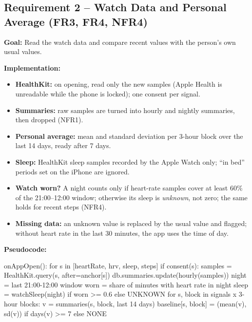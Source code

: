 \documentclass[conference]{IEEEtran}
\newcommand{\goal}[1]{\noindent\textbf{Goal:} #1\par\smallskip}
\newcommand{\impl}{\noindent\textbf{Implementation:}}
\newcommand{\pcode}{\noindent\textbf{Pseudocode:}}
\begin{document}
\subsection{Requirement 2 -- Watch Data and Personal Average (FR3, FR4, NFR4)}
\goal{Read the watch data and compare recent values with the person's own usual values.}
\impl
\begin{itemize}
\item \textbf{HealthKit:} on opening, read only the new samples (Apple Health is unreadable while the phone is locked); one consent per signal.
\item \textbf{Summaries:} raw samples are turned into hourly and nightly summaries, then dropped (NFR1).
\item \textbf{Personal average:} mean and standard deviation per 3-hour block over the last 14 days, ready after 7 days.
\item \textbf{Sleep:} HealthKit sleep samples recorded by the Apple Watch only; ``in bed'' periods set on the iPhone are ignored.
\item \textbf{Watch worn?} A night counts only if heart-rate samples cover at least 60\% of the 21:00--12:00 window; otherwise its sleep is \emph{unknown}, not zero; the same holds for recent steps (NFR4).
\item \textbf{Missing data:} an unknown value is replaced by the usual value and flagged; without heart rate in the last 30 minutes, the app uses the time of day.
\end{itemize}
\par\noindent\begin{minipage}{\columnwidth}
\pcode
\begin{code}
onAppOpen():
  for s in [heartRate, hrv, sleep, steps] if consent(s):
    samples = HealthKit.query(s, after=anchor[s])
    db.summaries.update(hourly(samples))
  night = last 21:00-12:00 window
  worn  = share of minutes with heart rate in night
  sleep = watchSleep(night) if worn >= 0.6 else UNKNOWN
  for s, block in signals x 3-hour blocks:
    v = summaries(s, block, last 14 days)
    baseline[s, block] = (mean(v), sd(v)) if days(v) >= 7
                         else NONE
\end{code}
\end{minipage}\par
\end{document}
